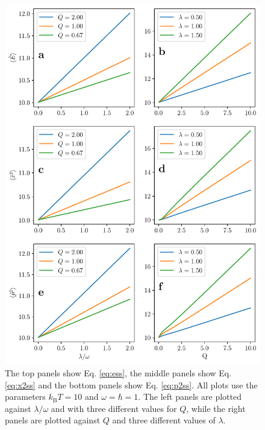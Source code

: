 \begin{figure}
    \centering
    \includegraphics[width=\textwidth]{measurement_result.pdf}
    \caption{ \small The top panels show Eq. \eqref{eq:ess}, the middle panels show Eq. \eqref{eq:x2ss} and the bottom panels show Eq. \eqref{eq:p2ss}. All plots use the parameters $k_\mathrm{B}T = 10$ and $\omega = \hbar = 1$. The left panels are plotted against $\lambda / \omega$ and with three different values for $Q$, while the right panels are plotted against $Q$ and three different values of $\lambda$. }
    \label{fig:steady_state}
\end{figure}